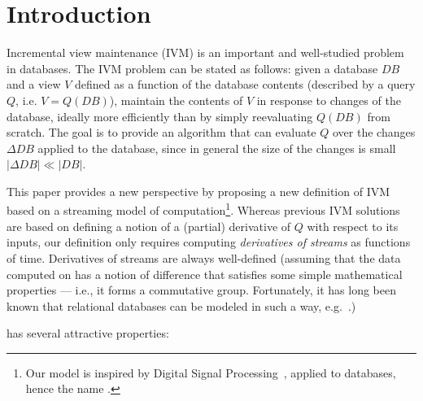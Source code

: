 \section{Introduction}\label{sec:introduction}

Incremental view maintenance (IVM) is an important and well-studied problem in
databases.  The IVM problem can be stated as follows: given a database $DB$ and
a view $V$ defined as a function of the database contents
(described by a query $Q$, i.e. $V = Q(DB)$),
maintain the contents of $V$ in response to changes of the database,
ideally more efficiently than by simply reevaluating $Q(DB)$ from scratch.  The goal is
to provide an algorithm that can evaluate $Q$ over the changes $\Delta DB$ applied
to the database, since in general the size of the changes is small $|\Delta DB| \ll |DB|$.

This paper provides a new perspective by proposing a new definition
of IVM based on a streaming model of computation\footnote{Our model is inspired by Digital Signal
Processing~\cite{rabiner-book75}, applied to databases, hence the name \dbsp.}.  Whereas previous
IVM solutions are based on defining a notion of a (partial) derivative of $Q$ with respect to its inputs,
our definition only requires computing \emph{derivatives of streams} as functions of time.
Derivatives of streams are always well-defined (assuming that the data computed on has a notion of difference
that satisfies some simple mathematical properties --- i.e., it forms a commutative
group.  Fortunately, it has long been known that relational databases can be modeled
in such a way, e.g.~\cite{green-pods07, koch-pods10}.)

\dbsp has several attractive properties:

